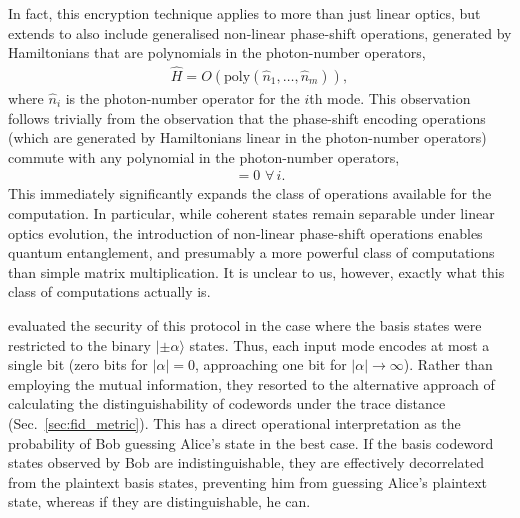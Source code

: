 \documentclass[aps,rmp,twocolumn,amsmath,amssymb,nofootinbib,superscriptaddress,longbibliography,floatfix,table-of-contents,eqsecnum]{revtex4-1}
\newcommand{\ket}[1]{|#1\rangle}
\begin{document}
In fact, this encryption technique applies to more than just linear optics, but extends to also include generalised non-linear phase-shift operations, generated by Hamiltonians that are polynomials in the photon-number operators,
\begin{align}
\hat{H} = O(\text{poly}(\hat{n}_1,\dots,\hat{n}_m)),
\end{align}
where $\hat{n}_i$ is the photon-number operator for the $i$th mode. This observation follows trivially from the observation that the phase-shift encoding operations (which are generated by Hamiltonians linear in the photon-number operators) commute with any polynomial in the photon-number operators,
\begin{align}
[\hat{n}_i,\text{poly}(\hat{n}_1,\dots,\hat{n}_m)] = 0\,\,\forall \, i.
\end{align}
This immediately significantly expands the class of operations available for the computation. In particular, while coherent states remain separable under linear optics evolution, the introduction of non-linear phase-shift operations enables quantum entanglement, and presumably a more powerful class of computations than simple matrix multiplication. It is unclear to us, however, exactly what this class of computations actually is.

\cite{siHuiTan} evaluated the security of this protocol in the case where the basis states were restricted to the binary $\ket{\pm\alpha}$ states. Thus, each input mode encodes at most a single bit (zero bits for \mbox{$|\alpha|=0$}, approaching one bit for \mbox{$|\alpha|\to\infty$}). Rather than employing the mutual information, they resorted to the alternative approach of calculating the distinguishability of codewords under the trace distance (Sec.~\ref{sec:fid_metric}). This has a direct operational interpretation as the probability of Bob guessing Alice's state in the best case. If the basis codeword states observed by Bob are indistinguishable, they are effectively decorrelated from the plaintext basis states, preventing him from guessing Alice's plaintext state, whereas if they are distinguishable, he can.
\end{document}
